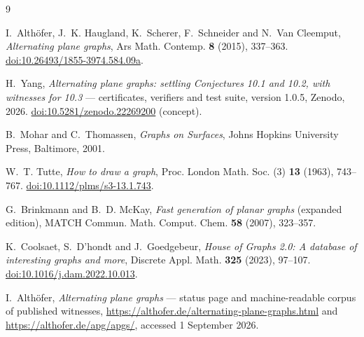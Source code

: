 \documentclass[11pt,a4paper]{amsart}
\theoremstyle{plain}
\theoremstyle{definition}
\begin{document}
\begin{thebibliography}{9}

I.~Alth\"ofer, J.~K. Haugland, K.~Scherer, F.~Schneider and N.~Van Cleemput,
\emph{Alternating plane graphs},
Ars Math. Contemp. \textbf{8} (2015), 337--363.
\href{https://doi.org/10.26493/1855-3974.584.09a}{doi:10.26493/1855-3974.584.09a}.

H.~Yang, \emph{Alternating plane graphs: settling Conjectures 10.1 and 10.2,
with witnesses for 10.3} --- certificates, verifiers and test suite, version 1.0.5, Zenodo, 2026.
\href{https://doi.org/10.5281/zenodo.22269200}{doi:10.5281/zenodo.22269200}
(concept).

B.~Mohar and C.~Thomassen, \emph{Graphs on Surfaces},
Johns Hopkins University Press, Baltimore, 2001.

W.~T. Tutte, \emph{How to draw a graph},
Proc. London Math. Soc. (3) \textbf{13} (1963), 743--767.
\href{https://doi.org/10.1112/plms/s3-13.1.743}{doi:10.1112/plms/s3-13.1.743}.

G.~Brinkmann and B.~D. McKay,
\emph{Fast generation of planar graphs} (expanded edition),
MATCH Commun. Math. Comput. Chem. \textbf{58} (2007), 323--357.

K.~Coolsaet, S.~D'hondt and J.~Goedgebeur,
\emph{House of Graphs 2.0: A database of interesting graphs and more},
Discrete Appl. Math. \textbf{325} (2023), 97--107.
\href{https://doi.org/10.1016/j.dam.2022.10.013}{doi:10.1016/j.dam.2022.10.013}.

I.~Alth\"ofer, \emph{Alternating plane graphs} --- status page and
machine-readable corpus of published witnesses,
\url{https://althofer.de/alternating-plane-graphs.html} and
\url{https://althofer.de/apg/apgs/}, accessed 1 September 2026.

\end{thebibliography}
\end{document}
